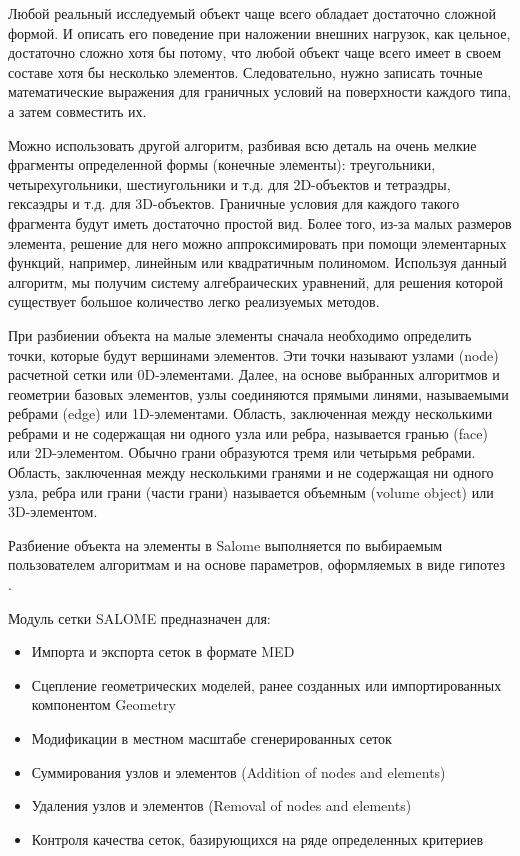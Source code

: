 \documentclass[a4paper,12pt]{article}
\theoremstyle{plain} %
\theoremstyle{definition} %
\theoremstyle{remark} %
\begin{document}
	Любой реальный исследуемый объект чаще всего обладает достаточно сложной формой. И описать его поведение при наложении внешних нагрузок, как цельное, достаточно сложно хотя бы потому, что любой объект чаще всего имеет в своем составе хотя бы несколько элементов. Следовательно, нужно записать точные математические выражения для граничных условий на поверхности каждого типа, а затем совместить их.
	
	Можно использовать другой алгоритм, разбивая всю деталь на очень мелкие фрагменты определенной формы (конечные элементы): треугольники, четырехугольники, шестиугольники и т.д. для 2D-объектов и тетраэдры, гексаэдры и т.д. для 3D-объектов. Граничные условия для каждого такого фрагмента будут иметь достаточно простой вид. Более того, из-за малых размеров элемента, решение для него можно аппроксимировать при помощи элементарных функций, например, линейным или квадратичным полиномом. Используя данный алгоритм, мы получим систему алгебраических уравнений, для решения которой существует большое количество легко реализуемых методов.
	
	При разбиении объекта на малые элементы сначала необходимо определить точки, которые будут вершинами элементов. Эти точки называют узлами (node) расчетной сетки или 0D-элементами. Далее, на основе выбранных алгоритмов и геометрии базовых элементов, узлы соединяются прямыми линями, называемыми ребрами (edge) или 1D-элементами. Область, заключенная между несколькими ребрами и не содержащая ни одного узла или ребра, называется гранью (face) или 2D-элементом. Обычно грани образуются тремя или четырьмя ребрами. Область, заключенная между несколькими гранями и не содержащая ни одного узла, ребра или грани (части грани) называется объемным (volume object) или 3D-элементом.
	
	Разбиение объекта на элементы в Salome выполняется по выбираемым пользователем алгоритмам и на основе параметров, оформляемых в виде гипотез \cite{wIbmSalomeMesh}.
	
	Модуль сетки SALOME предназначен для\cite{wOfDoc}:
	\begin{itemize}
		\item Импорта и экспорта сеток в формате MED
		\item Сцепление геометрических моделей, ранее созданных или импортированных компонентом Geometry
		\item Модификации в местном масштабе сгенерированных сеток
		\item Суммирования узлов и элементов (Addition of nodes and elements)
		\item Удаления узлов и элементов (Removal of nodes and elements)
		\item Контроля качества сеток, базирующихся на ряде определенных критериев
	\end{itemize}
	
	\newpage
	
\end{document}
